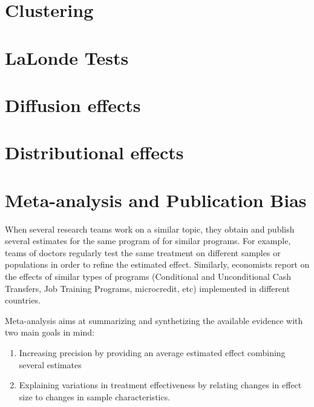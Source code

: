\documentclass[]{book}
\providecommand{\tightlist}{%
  \setlength{\itemsep}{0pt}\setlength{\parskip}{0pt}}
\theoremstyle{definition}
\theoremstyle{definition}
\theoremstyle{definition}
\theoremstyle{remark}
\begin{document}
\hypertarget{cluster}{%
\chapter{Clustering}\label{cluster}}

\hypertarget{LaLonde}{%
\chapter{LaLonde Tests}\label{LaLonde}}

\hypertarget{Diffusion}{%
\chapter{Diffusion effects}\label{Diffusion}}

\hypertarget{Distribution}{%
\chapter{Distributional effects}\label{Distribution}}

\hypertarget{sec:meta}{%
\chapter{Meta-analysis and Publication Bias}\label{sec:meta}}

When several research teams work on a similar topic, they obtain and publish several estimates for the same program of for similar programs.
For example, teams of doctors regularly test the same treatment on different samples or populations in order to refine the estimated effect.
Similarly, economists report on the effects of similar types of programs (Conditional and Unconditional Cash Transfers, Job Training Programs, microcredit, etc) implemented in different countries.

Meta-analysis aims at summarizing and synthetizing the available evidence with two main goals in mind:

\begin{enumerate}
\def\labelenumi{\arabic{enumi}.}
\tightlist
\item
  Increasing precision by providing an average estimated effect combining several estimates
\item
  Explaining variations in treatment effectiveness by relating changes in effect size to changes in sample characteristics.
\end{enumerate}
\end{document}
